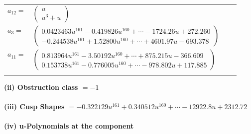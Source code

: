 \documentclass[1p]{elsarticle_modified}
\theoremstyle{definition}
\begin{document}
\begin{tabular}{m{7pt} m{180pt} m{7pt} m{180pt} }
\flushright $a_{12}=$&$\begin{pmatrix}u\\u^3+u\end{pmatrix}$ \\
\flushright $a_{3}=$&$\begin{pmatrix}0.0423463 u^{161}-0.419826 u^{160}+\cdots-1724.26 u+272.260\\-0.244538 u^{161}+1.52800 u^{160}+\cdots+4601.97 u-693.378\end{pmatrix}$ \\
\flushright $a_{11}=$&$\begin{pmatrix}0.813964 u^{161}-3.50192 u^{160}+\cdots+875.215 u-366.609\\0.153738 u^{161}-0.776005 u^{160}+\cdots-978.802 u+117.885\end{pmatrix}$\\&\end{tabular}
\flushleft \textbf{(ii) Obstruction class $= -1$}\\~\\
\flushleft \textbf{(iii) Cusp Shapes $= -0.322129 u^{161}+0.340512 u^{160}+\cdots-12922.8 u+2312.72$}\\~\\
\newpage\renewcommand{\arraystretch}{1}
\flushleft \textbf{(iv) u-Polynomials at the component}\newline \\
\end{document}
